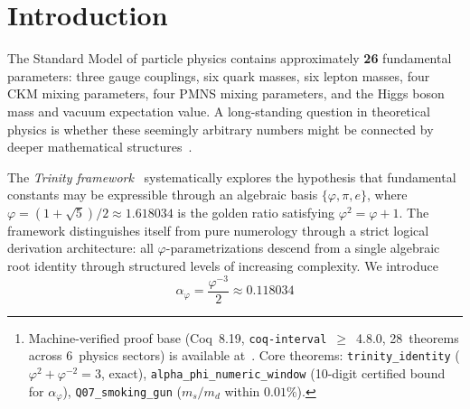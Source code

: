 \documentclass[10pt,a4paper]{article}
\begin{document}
\begin{abstract}
\medskip\noindent\textbf{Keywords:} golden ratio; $\varphi$-parametrization; Standard Model constants;
strong coupling constant; $\alpha_\varphi$; CKM matrix; PMNS neutrino mixing; Koide formula;
Loop Quantum Gravity; Immirzi parameter; Monte Carlo significance; look-elsewhere effect;
Zamolodchikov theorem; A$_5$ discrete symmetry
\footnote{Machine-verified proof base (Coq~8.19,
\texttt{coq-interval}~$\ge$~4.8.0, 28~theorems across
6~physics sectors) is available at~\cite{trinity2024}.
Core theorems: \texttt{trinity\_identity}
($\varphi^2+\varphi^{-2}=3$, exact),
\texttt{alpha\_phi\_numeric\_window} (10-digit certified
bound for $\alpha_\varphi$),
\texttt{Q07\_smoking\_gun} ($m_s/m_d$ within $0.01\%$).}

\end{abstract}

\section*{Introduction}

The Standard Model of particle physics contains approximately \textbf{26} fundamental parameters:
three gauge couplings, six quark masses, six lepton masses, four CKM mixing parameters, four PMNS
mixing parameters, and the Higgs boson mass and vacuum expectation value. A long-standing question
in theoretical physics is whether these seemingly arbitrary numbers might be connected by deeper
mathematical structures~\cite{PDG2024}.

The \textit{Trinity framework}~\cite{trinity2024} systematically explores the hypothesis that
fundamental constants may be expressible through an algebraic basis $\{\varphi, \pi, e\}$, where
$\varphi = (1+\sqrt{5})/2 \approx 1.618034$ is the golden ratio satisfying $\varphi^2 = \varphi + 1$.
The framework distinguishes itself from pure numerology through a strict logical derivation
architecture: all $\varphi$-parametrizations descend from a single algebraic root identity through
structured levels of increasing complexity. We introduce
\[
  \alpha_\varphi = \frac{\varphi^{-3}}{2} \approx 0.118034
\]
\end{document}
